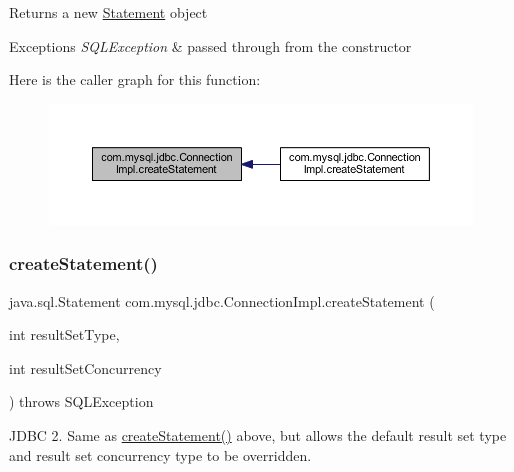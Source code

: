 \begin{DoxyReturn}{Returns}
a new \mbox{\hyperlink{interfacecom_1_1mysql_1_1jdbc_1_1_statement}{Statement}} object 
\end{DoxyReturn}

\begin{DoxyExceptions}{Exceptions}
{\em S\+Q\+L\+Exception} & passed through from the constructor \\
\hline
\end{DoxyExceptions}
Here is the caller graph for this function\+:\nopagebreak
\begin{figure}[H]
\begin{center}
\leavevmode
\includegraphics[width=350pt]{classcom_1_1mysql_1_1jdbc_1_1_connection_impl_af371aac6b857e26e7f92d486c52e3994_icgraph}
\end{center}
\end{figure}
\mbox{\label{classcom_1_1mysql_1_1jdbc_1_1_connection_impl_a17157765e71edeb5534901236da52fa3}} 
\subsubsection{\texorpdfstring{create\+Statement()}{createStatement()}\hspace{0.1cm}{\footnotesize\ttfamily [2/3]}}
{\footnotesize\ttfamily java.\+sql.\+Statement com.\+mysql.\+jdbc.\+Connection\+Impl.\+create\+Statement (\begin{DoxyParamCaption}\item[{int}]{result\+Set\+Type,  }\item[{int}]{result\+Set\+Concurrency }\end{DoxyParamCaption}) throws S\+Q\+L\+Exception}

J\+D\+BC 2. Same as \mbox{\hyperlink{classcom_1_1mysql_1_1jdbc_1_1_connection_impl_af371aac6b857e26e7f92d486c52e3994}{create\+Statement()}} above, but allows the default result set type and result set concurrency type to be overridden.


